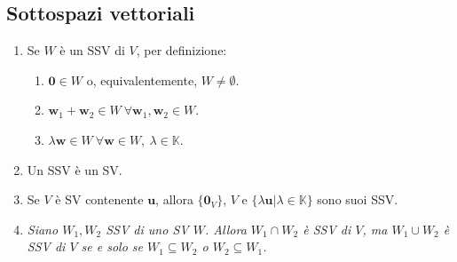 \documentclass[draft]{article}
\newcommand{\bl}[1]{\mathbf{#1}}
\newcommand{\vu}{\mathbf{u}}
\newcommand{\vw}{\mathbf{w}}
\begin{document}
\subsection{Sottospazi vettoriali}
\begin{enumerate}

\item Se $W$ è un SSV di $V$, per definizione:
\begin{enumerate}
\item $\bl{0} \in W$ o, equivalentemente, $W \neq \emptyset$.
\item $\vw _1 + \vw _2 \in W \ \forall \vw _1 , \vw _2 \in W$.
\item $\lambda \vw  \in W \ \forall \vw \in W, \ \lambda \in \mathbb{K}$.
\end{enumerate}

\item Un SSV è un SV.

\item Se $V$ è SV contenente $\vu$, allora $\{\bl{0}_V\}$, $V$ e $\{\lambda \vu | \lambda \in \mathbb{K}\}$ sono suoi SSV.

\item \textit{Siano $W_1 , W_2$ SSV di uno SV $W$. Allora $W_1 \cap W_2$ è SSV di $V$, ma $W_1 \cup W_2$ è SSV di $V$ se e solo se $W_1 \subseteq W_2$ o $W_2 \subseteq W_1$.}
\end{enumerate}
\end{document}

